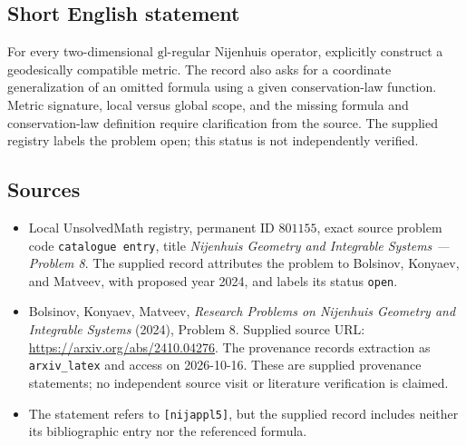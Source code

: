 \documentclass[11pt]{article}
\begin{document}
\subsection{Short English statement}
For every two-dimensional \(\mathrm{gl}\)-regular Nijenhuis operator, explicitly construct a geodesically compatible metric. The record also asks for a coordinate generalization of an omitted formula using a given conservation-law function. Metric signature, local versus global scope, and the missing formula and conservation-law definition require clarification from the source. The supplied registry labels the problem open; this status is not independently verified.
\subsection{Sources}
\begin{itemize}
\item Local UnsolvedMath registry, permanent ID \(801155\), exact source problem code \texttt{catalogue entry}, title \emph{Nijenhuis Geometry and Integrable Systems --- Problem 8}. The supplied record attributes the problem to Bolsinov, Konyaev, and Matveev, with proposed year 2024, and labels its status \texttt{open}.
\item Bolsinov, Konyaev, Matveev, \emph{Research Problems on Nijenhuis Geometry and Integrable Systems} (2024), Problem 8. Supplied source URL: \url{https://arxiv.org/abs/2410.04276}. The provenance records extraction as \texttt{arxiv\_latex} and access on 2026-10-16. These are supplied provenance statements; no independent source visit or literature verification is claimed.
\item The statement refers to \texttt{[nijappl5]}, but the supplied record includes neither its bibliographic entry nor the referenced formula.
\end{itemize}
\end{document}
